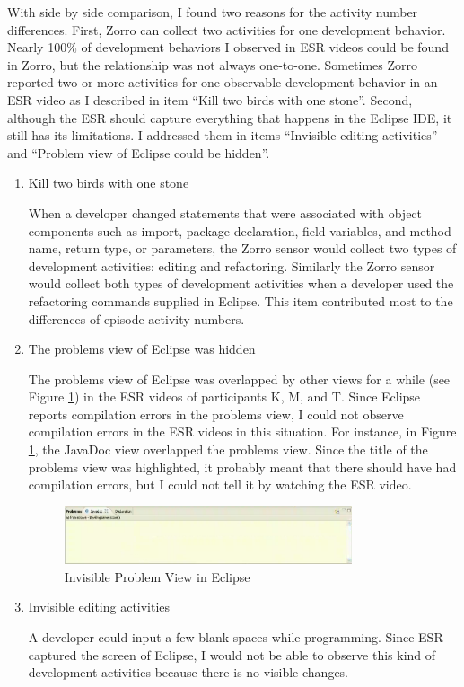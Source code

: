 With side by side comparison, I found two reasons for the activity number
differences. First, Zorro can collect two activities for one 
development behavior. Nearly 100\% of development behaviors I observed 
in ESR videos could be found in Zorro, but the relationship was not always 
one-to-one. Sometimes Zorro reported two or more activities for one observable 
development behavior in an ESR video as I described 
in item ``Kill two birds with one stone''. Second, although the ESR should 
capture everything that happens in the Eclipse IDE, it still has its 
limitations. I addressed them in items ``Invisible editing activities'' 
and ``Problem view of Eclipse could be hidden''.
\begin{enumerate}
  \item Kill two birds with one stone
  
  When a developer changed statements that were associated with object
  components such as import, package declaration, field variables, and
  method name, return type, or parameters, the Zorro sensor would
  collect two types of development activities: editing and
  refactoring. Similarly the Zorro sensor would collect both types
  of development activities when a developer used the refactoring
  commands supplied in Eclipse. This item contributed most to the
  differences of episode activity numbers.

  \item The problems view of Eclipse was hidden
  
  The problems view of Eclipse was overlapped by other views for a
  while (see Figure \ref{fig:InvisibleEclipseProblemView}) in the ESR
  videos of participants K, M, and T. Since Eclipse reports compilation
  errors in the problems view, I could not observe compilation errors in
  the ESR videos in this situation. For instance, in Figure
  \ref{fig:InvisibleEclipseProblemView}, the JavaDoc view overlapped
  the problems view.  Since the title of the problems view was highlighted, 
  it probably meant that there should have had compilation errors, but I could 
  not tell it by watching the ESR video. 
  \begin{figure}[htbp]
    \centering
    \includegraphics[width=0.8\textwidth]{figs/ESR-InvisibleProblemPane.eps}
    \caption{Invisible Problem View in Eclipse}
    \label{fig:InvisibleEclipseProblemView}
  \end{figure}  

  \item Invisible editing activities

  A developer could input a few blank spaces while programming. Since
  ESR captured the screen of Eclipse, I would not be able to observe
  this kind of development activities because there is no visible 
  changes. 

\end{enumerate}

